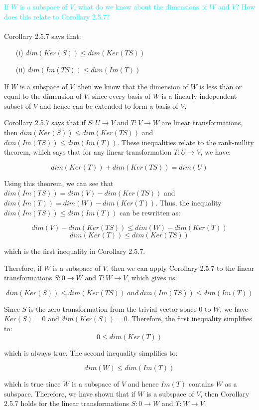 \documentclass[fontsize=12pt]{scrartcl}
\begin{document}
\newpage

\noindent
\textcolor{cyan}{If $W$ is a subspace of $V$, what do we know about the dimensions of $W$ and $V$? How does this relate to Corollary 2.5.7?}\\
\\
Corollary 2.5.7 says that:
\begin{itemize}
    \item[(i)] $dim(Ker(S)) \leq dim(Ker(TS))$
    \item[(ii)] $dim(Im(TS)) \leq dim(Im(T))$
\end{itemize}
\noindent
If $W$ is a subspace of $V$, then we know that the dimension of $W$ is less than or equal to the dimension of $V$, since every basis of $W$ is a linearly independent subset of $V$ and hence can be extended to form a basis of $V$.

\noindent
Corollary 2.5.7 says that if $S: U \to V$ and $T: V \to W$ are linear transformations, then $dim(Ker(S)) \leq dim(Ker(TS))$ and $dim(Im(TS)) \leq dim(Im(T))$. These inequalities relate to the rank-nullity theorem, which says that for any linear transformation $T: U \to V$, we have:

$$dim(Ker(T))+ dim(Ker(TS)) = dim(U) $$

\noindent
Using this theorem, we can see that $dim(Im(TS)) = dim(V) - dim(Ker(TS))$ and $dim(Im(T)) = dim(W) - dim(Ker(T))$. Thus, the inequality $dim(Im(TS)) \leq dim(Im(T))$ can be rewritten as:

$$dim(V) - dim(Ker(TS)) \leq dim(W) - dim(Ker(T)) $$
$$dim(Ker(T)) \leq dim(Ker(TS)) $$

\noindent
which is the first inequality in Corollary 2.5.7.

\noindent
Therefore, if $W$ is a subspace of $V$, then we can apply Corollary 2.5.7 to the linear transformations $S: {0} \to W$ and $T: W \to V$, which gives us:

$$dim(Ker(S)) \leq dim(Ker(TS))\ and\ dim(Im(TS)) \leq dim(Im(T)) $$

\noindent
Since $S$ is the zero transformation from the trivial vector space ${0}$ to $W$, we have $Ker(S) = {0}$ and $dim(Ker(S)) = 0$. Therefore, the first inequality simplifies to:
$$0\leq dim(Ker(T)) $$

\noindent
which is always true. The second inequality simplifies to:

$$dim(W) \leq dim(Im(T)) $$

\noindent
which is true since $W$ is a subspace of $V$ and hence $Im(T)$ contains $W$ as a subspace. Therefore, we have shown that if $W$ is a subspace of $V$, then Corollary 2.5.7 holds for the linear transformations $S: {0} \to W$ and $T: W \to V$.
\end{document}

